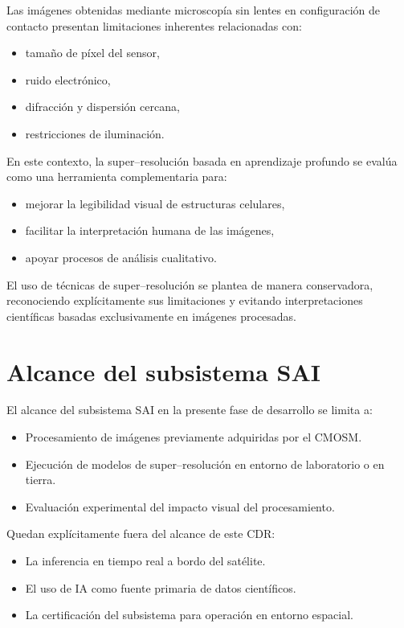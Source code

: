 Las imágenes obtenidas mediante microscopía sin lentes en configuración de
contacto presentan limitaciones inherentes relacionadas con:
\begin{itemize}
    \item tamaño de píxel del sensor,
    \item ruido electrónico,
    \item difracción y dispersión cercana,
    \item restricciones de iluminación.
\end{itemize}

En este contexto, la super--resolución basada en aprendizaje profundo se evalúa
como una herramienta complementaria para:
\begin{itemize}
    \item mejorar la legibilidad visual de estructuras celulares,
    \item facilitar la interpretación humana de las imágenes,
    \item apoyar procesos de análisis cualitativo.
\end{itemize}

El uso de técnicas de super--resolución se plantea de manera conservadora,
reconociendo explícitamente sus limitaciones y evitando interpretaciones
científicas basadas exclusivamente en imágenes procesadas.

\section{Alcance del subsistema SAI}

El alcance del subsistema SAI en la presente fase de desarrollo se limita a:

\begin{itemize}
    \item Procesamiento de imágenes previamente adquiridas por el CMOSM.
    \item Ejecución de modelos de super--resolución en entorno de laboratorio o
    en tierra.
    \item Evaluación experimental del impacto visual del procesamiento.
\end{itemize}

Quedan explícitamente fuera del alcance de este CDR:
\begin{itemize}
    \item La inferencia en tiempo real a bordo del satélite.
    \item El uso de IA como fuente primaria de datos científicos.
    \item La certificación del subsistema para operación en entorno espacial.
\end{itemize}

